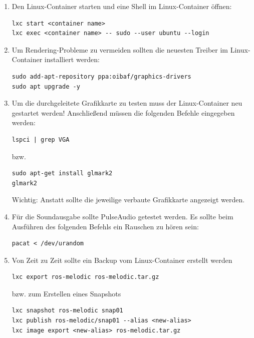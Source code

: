\begin{enumerate}[label*=\arabic*.]
    \item Den Linux-Container starten und eine Shell im Linux-Container öffnen:
        \begin{lstlisting}[style=bash]
lxc start <container name>
lxc exec <container name> -- sudo --user ubuntu --login
        \end{lstlisting}

    \item Um Rendering-Probleme zu vermeiden sollten die neuesten Treiber im Linux-Container installiert werden:
        \begin{lstlisting}[style=bash]
sudo add-apt-repository ppa:oibaf/graphics-drivers
sudo apt upgrade -y
        \end{lstlisting}

    \item Um die durchgeleitete Grafikkarte zu testen muss der Linux-Container neu gestartet werden! Anschließend müssen die folgenden Befehle eingegeben werden:
        \begin{lstlisting}[style=bash]
lspci | grep VGA
        \end{lstlisting}
        bzw.
        \begin{lstlisting}[style=bash]
sudo apt-get install glmark2
glmark2
        \end{lstlisting}

        \begin{redbox}{Wichtig:}
            Anstatt  sollte die jeweilige verbaute Grafikkarte angezeigt werden.
        \end{redbox}

    \item Für die Soundausgabe sollte PulseAudio getestet werden. Es sollte beim Ausführen des folgenden Befehls ein Rauschen zu hören sein:
        \begin{lstlisting}[style=bash]
pacat < /dev/urandom
        \end{lstlisting}

    \item Von Zeit zu Zeit sollte ein Backup vom Linux-Container erstellt werden
        \begin{lstlisting}[style=bash]
lxc export ros-melodic ros-melodic.tar.gz
        \end{lstlisting}

        bzw. zum Erstellen eines Snapshots

        \begin{lstlisting}[style=bash]
lxc snapshot ros-melodic snap01
lxc publish ros-melodic/snap01 --alias <new-alias>
lxc image export <new-alias> ros-melodic.tar.gz
        \end{lstlisting}


\end{enumerate}
